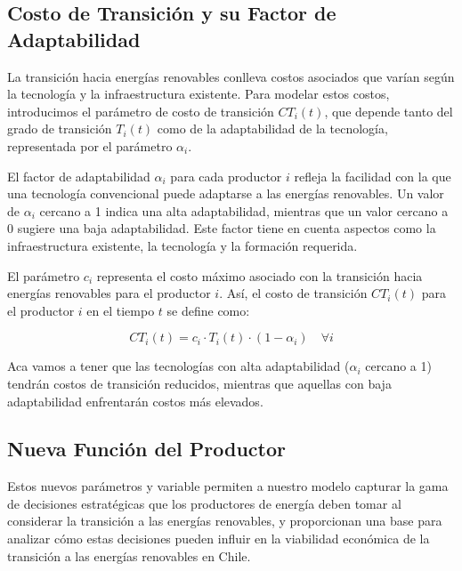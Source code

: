\subsection{Costo de Transición y su Factor de Adaptabilidad}

La transición hacia energías renovables conlleva costos asociados que varían según la tecnología y la infraestructura existente. Para modelar estos costos, introducimos el parámetro de costo de transición \( CT_i(t) \), que depende tanto del grado de transición \( T_i(t) \) como de la adaptabilidad de la tecnología, representada por el parámetro \( \alpha_i \).\vspace{2.5mm}

El factor de adaptabilidad \( \alpha_i \) para cada productor \( i \) refleja la facilidad con la que una tecnología convencional puede adaptarse a las energías renovables. Un valor de \( \alpha_i \) cercano a 1 indica una alta adaptabilidad, mientras que un valor cercano a 0 sugiere una baja adaptabilidad. Este factor tiene en cuenta aspectos como la infraestructura existente, la tecnología y la formación requerida.\vspace{2.5mm}

El parámetro \( c_i \) representa el costo máximo asociado con la transición hacia energías renovables para el productor \( i \). Así, el costo de transición \( CT_i(t) \) para el productor \( i \) en el tiempo \( t \) se define como:

\begin{equation}
CT_i(t) = c_i \cdot T_i(t) \cdot (1 - \alpha_i) \quad \forall i
\label{3.3}
\end{equation}


Aca vamos a tener que las tecnologías con alta adaptabilidad (\( \alpha_i \) cercano a 1) tendrán costos de transición reducidos, mientras que aquellas con baja adaptabilidad enfrentarán costos más elevados.


\subsection{Nueva Función del Productor}\label{c36}

Estos nuevos parámetros y variable permiten a nuestro modelo capturar la gama de decisiones estratégicas que los productores de energía deben tomar al considerar la transición a las energías renovables, y proporcionan una base para analizar cómo estas decisiones pueden influir en la viabilidad económica de la transición a las energías renovables en Chile.\vspace{2.5mm}


